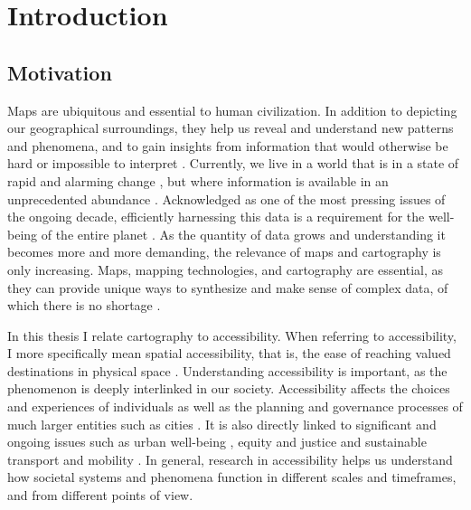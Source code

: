 \section{Introduction}



\subsection{Motivation}

Maps are ubiquitous and essential to human civilization.
In addition to depicting our geographical surroundings,
they help us reveal and understand new patterns and phenomena,
and to gain insights from information
that would otherwise be hard or impossible to interpret \parencite{mac2004}.
Currently, we live in a world that is in a state of rapid and
alarming change \parencite{un2023},
but where information is available in an unprecedented abundance
\parencite{rob2017a, un2023}.
Acknowledged as one of the most pressing issues of the ongoing decade,
efficiently harnessing this data is a requirement
for the well-being of the entire planet \parencite{un2020}.
As the quantity of data grows
and understanding it becomes more and more demanding,
the relevance of maps and cartography is only increasing.
Maps, mapping technologies, and cartography are essential,
as they can provide unique ways to synthesize and make sense of complex data,
of which there is no shortage \parencite{kra2021}.



In this thesis I relate cartography to accessibility.
When referring to accessibility,
I more specifically mean spatial accessibility, that is,
the ease of reaching valued destinations in physical space \parencite{lev2020}.
Understanding accessibility is important,
as the phenomenon is deeply interlinked in our society.
Accessibility affects the choices and experiences of individuals \parencite{kwa1998, kwa2003}
as well as the planning and governance processes
of much larger entities such as cities \parencite{cur2010, low2015}.
It is also directly linked to significant and ongoing issues such as
urban well-being \parencite{zha2011},
equity and justice \parencite{per2017, che2020}
and sustainable transport and mobility \parencite{son2017, mah2019}.
In general, research in accessibility helps us understand
how societal systems and phenomena function
in different scales and timeframes, and from different points of view.

